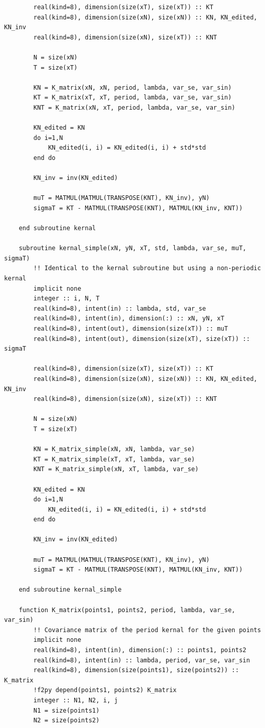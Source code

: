 \documentclass[a4paper]{article}
\begin{document}
\begin{verbatim}
        real(kind=8), dimension(size(xT), size(xT)) :: KT
        real(kind=8), dimension(size(xN), size(xN)) :: KN, KN_edited, KN_inv
        real(kind=8), dimension(size(xN), size(xT)) :: KNT
        
        N = size(xN)
        T = size(xT)

        KN = K_matrix(xN, xN, period, lambda, var_se, var_sin)
        KT = K_matrix(xT, xT, period, lambda, var_se, var_sin)
        KNT = K_matrix(xN, xT, period, lambda, var_se, var_sin)

        KN_edited = KN
        do i=1,N
            KN_edited(i, i) = KN_edited(i, i) + std*std
        end do

        KN_inv = inv(KN_edited)
        
        muT = MATMUL(MATMUL(TRANSPOSE(KNT), KN_inv), yN)
        sigmaT = KT - MATMUL(TRANSPOSE(KNT), MATMUL(KN_inv, KNT))
        
    end subroutine kernal

    subroutine kernal_simple(xN, yN, xT, std, lambda, var_se, muT, sigmaT)
        !! Identical to the kernal subroutine but using a non-periodic kernal
        implicit none
        integer :: i, N, T
        real(kind=8), intent(in) :: lambda, std, var_se
        real(kind=8), intent(in), dimension(:) :: xN, yN, xT
        real(kind=8), intent(out), dimension(size(xT)) :: muT
        real(kind=8), intent(out), dimension(size(xT), size(xT)) :: sigmaT

        real(kind=8), dimension(size(xT), size(xT)) :: KT
        real(kind=8), dimension(size(xN), size(xN)) :: KN, KN_edited, KN_inv
        real(kind=8), dimension(size(xN), size(xT)) :: KNT
        
        N = size(xN)
        T = size(xT)

        KN = K_matrix_simple(xN, xN, lambda, var_se)
        KT = K_matrix_simple(xT, xT, lambda, var_se)
        KNT = K_matrix_simple(xN, xT, lambda, var_se)

        KN_edited = KN
        do i=1,N
            KN_edited(i, i) = KN_edited(i, i) + std*std
        end do

        KN_inv = inv(KN_edited)
        
        muT = MATMUL(MATMUL(TRANSPOSE(KNT), KN_inv), yN)
        sigmaT = KT - MATMUL(TRANSPOSE(KNT), MATMUL(KN_inv, KNT))
        
    end subroutine kernal_simple
    
    function K_matrix(points1, points2, period, lambda, var_se, var_sin)
        !! Covariance matrix of the period kernal for the given points
        implicit none
        real(kind=8), intent(in), dimension(:) :: points1, points2
        real(kind=8), intent(in) :: lambda, period, var_se, var_sin
        real(kind=8), dimension(size(points1), size(points2)) :: K_matrix
        !f2py depend(points1, points2) K_matrix
        integer :: N1, N2, i, j
        N1 = size(points1)
        N2 = size(points2)


\end{verbatim}
\end{document}
